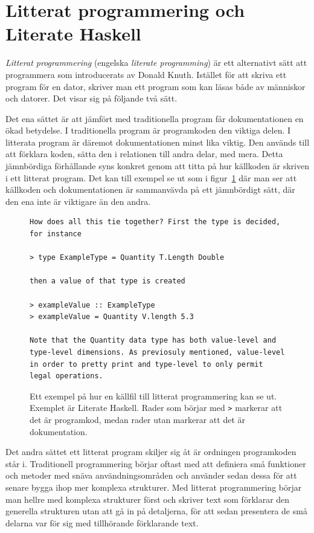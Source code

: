 \section{Litterat programmering och Literate Haskell}\label{sec:lhs}
\begin{draft}
\textit{Litterat programmering} (engelska \textit{literate programming}) är ett
alternativt sätt att programmera som introducerats av Donald Knuth\cite{knuth}.
Istället för att skriva ett program för en dator, skriver man ett program som
kan läsas både av människor och datorer. Det visar sig på följande två sätt.

Det ena sättet är att jämfört med traditionella program får dokumentationen en
ökad betydelse. I traditionella program är programkoden den viktiga delen. I
litterata program är däremot dokumentationen minst lika viktig. Den används till
att förklara koden, sätta den i relationen till andra delar, med mera.
Detta jämnbördiga förhållande syns konkret genom att titta på hur källkoden är
skriven i ett litterat program. Det kan till exempel se ut som i
figur~\ref{fig:litterate_haskell_exempel} där man ser att källkoden och
dokumentationen är sammanvävda på ett jämnbördigt sätt, där den ena inte är
viktigare än den andra.

\begin{figure}[tph]
  \begin{lstlisting}[language={}]
How does all this tie together? First the type is decided, for instance

> type ExampleType = Quantity T.Length Double

then a value of that type is created

> exampleValue :: ExampleType
> exampleValue = Quantity V.length 5.3

Note that the Quantity data type has both value-level and type-level dimensions. As previosuly mentioned, value-level in order to pretty print and type-level to only permit legal operations.
\end{lstlisting}
  \caption{Ett exempel på hur en källfil till litterat programmering kan se ut.
           Exemplet är Literate Haskell. Rader som börjar med \texttt{>}
           markerar att det är programkod, medan rader utan markerar att det är
           dokumentation.}\label{fig:litterate_haskell_exempel} 
\end{figure}

Det andra sättet ett litterat program skiljer sig åt är ordningen programkoden
står i. Traditionell programmering börjar oftast med att definiera små funktioner
och metoder med snäva användningsområden och använder sedan dessa för att senare
bygga ihop mer komplexa strukturer. Med litterat programmering börjar man hellre
med komplexa strukturer först och skriver text som förklarar den generella
strukturen utan att gå in på detaljerna, för att sedan presentera de små
delarna var för sig med tillhörande förklarande text.


\end{draft}
